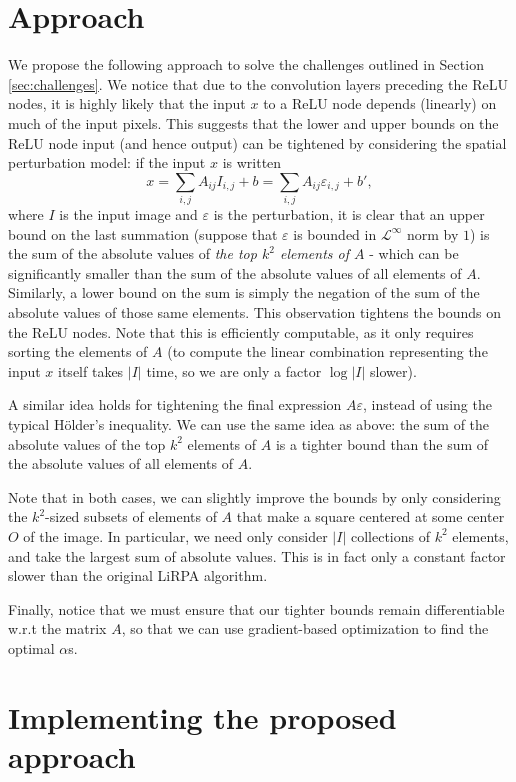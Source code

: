 \documentclass{article}
\begin{document}
\section{Approach}\label{sec:approach}

We propose the following approach to solve the challenges outlined in Section \ref{sec:challenges}. We notice that due to the convolution layers preceding the ReLU nodes, it is highly likely that the input $x$ to a ReLU node depends (linearly) on much of the input pixels. This suggests that the lower and upper bounds on the ReLU node input (and hence output) can be tightened by considering the spatial perturbation model: if the input $x$ is written
\[
    x = \sum_{i,j} A_{ij} I_{i,j} + b = \sum_{i,j} A_{ij} \varepsilon_{i,j} + b',
\]
where $I$ is the input image and $\varepsilon$ is the perturbation, it is clear that an upper bound on the last summation (suppose that $\varepsilon$ is bounded in $\mathcal L^\infty$ norm by $1$) is the sum of the absolute values of \emph{the top $k^2$ elements of $A$} - which can be significantly smaller than the sum of the absolute values of all elements of $A$. Similarly, a lower bound on the sum is simply the negation of the sum of the absolute values of those same elements. This observation tightens the bounds on the ReLU nodes. Note that this is efficiently computable, as it only requires sorting the elements of $A$ (to compute the linear combination representing the input $x$ itself takes $|I|$ time, so we are only a factor $\log |I|$ slower).

A similar idea holds for tightening the final expression $A\varepsilon$, instead of using the typical Hölder's inequality. We can use the same idea as above: the sum of the absolute values of the top $k^2$ elements of $A$ is a tighter bound than the sum of the absolute values of all elements of $A$.

Note that in both cases, we can slightly improve the bounds by only considering the $k^2$-sized subsets of elements of $A$ that make a square centered at some center $O$ of the image. In particular, we need only consider $|I|$ collections of $k^2$ elements, and take the largest sum of absolute values. This is in fact only a constant factor slower than the original LiRPA algorithm.

Finally, notice that we must ensure that our tighter bounds remain differentiable w.r.t the matrix $A$, so that we can use gradient-based optimization to find the optimal $\alpha$s. 

\section{Implementing the proposed approach}
\end{document}
